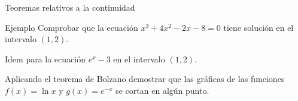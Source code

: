 \documentclass[8pt]{beamer}
\begin{document}
\begin{frame}[t]{Teoremas relativos a la continuidad}
\begin{exampleblock}{Ejemplo}
Comprobar que la ecuación $x^3+4x^2-2x-8=0$ tiene solución en el intervalo $(1,2)$.

Idem para la ecuación $e^x-3$ en el intervalo $(1,2)$.

Aplicando el teorema de Bolzano demostrar que las gráficas de las funciones $f(x)=\ln x$ y $g(x)=e^{-x}$ se cortan en algún punto.
\end{exampleblock}
\end{frame}
\end{document}
